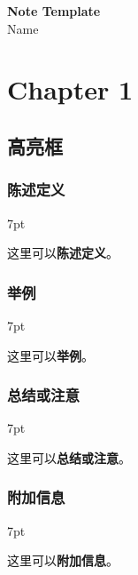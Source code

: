 \documentclass[hyperref, UTF8]{ctexart}
\newenvironment{formal}{%
\def\FrameCommand{%
\hspace{1pt}%
{\color{DarkBlue}\vrule width 2pt}%
{\color{blueshade}\vrule width 4pt}%
\colorbox{blueshade}%
}%
\MakeFramed{\advance\hsize-\width\FrameRestore}%
\noindent\hspace{-4.55pt}%
\begin{adjustwidth}{}{7pt}%
\vspace{2pt}%
}
{%
\vspace{12pt}\end{adjustwidth}\endMakeFramed%
}
\newenvironment{example}{%
\def\FrameCommand{%
\hspace{1pt}%
{\color{BurlyWood}\vrule width 2pt}%
{\color{brownshade}\vrule width 4pt}%
\colorbox{brownshade}%
}%
\MakeFramed{\advance\hsize-\width\FrameRestore}%
\noindent\hspace{-4.55pt}%
\begin{adjustwidth}{}{7pt}%
\vspace{2pt}%
}
{%
\vspace{12pt}\end{adjustwidth}\endMakeFramed%
}
\newenvironment{warning}{%
\def\FrameCommand{%
\hspace{1pt}%
{\color{LightCoral}\vrule width 2pt}%
{\color{redshade}\vrule width 4pt}%
\colorbox{redshade}%
}%
\MakeFramed{\advance\hsize-\width\FrameRestore}%
\noindent\hspace{-4.55pt}%
\begin{adjustwidth}{}{7pt}%
\vspace{2pt}%
}
{%
\vspace{12pt}\end{adjustwidth}\endMakeFramed%
}
\newenvironment{unimportant}{%
\def\FrameCommand{%
\hspace{1pt}%
{\color{DarkGrey}\vrule width 2pt}%
{\color{greyshade}\vrule width 4pt}%
\colorbox{greyshade}%
}%
\MakeFramed{\advance\hsize-\width\FrameRestore}%
\noindent\hspace{-4.55pt}%
\begin{adjustwidth}{}{7pt}%
\vspace{2pt}%
}
{%
\vspace{12pt}\end{adjustwidth}\endMakeFramed%
}
\begin{document}
\begin{center}
{\Huge \bf Note Template}\\
{\LARGE Name}\\
\end{center}


{\centering\section{Chapter 1}}

\subsection{高亮框}
\subsubsection{陈述定义}
\begin{formal}
    这里可以\textbf{陈述定义}。
\end{formal}
\subsubsection{举例}
\begin{example}
    这里可以\textbf{举例}。
\end{example}
\subsubsection{总结或注意}
\begin{warning}
    这里可以\textbf{总结或注意}。
\end{warning}
\subsubsection{附加信息}
\begin{unimportant}
    这里可以\textbf{附加信息}。
\end{unimportant}
\end{document}
